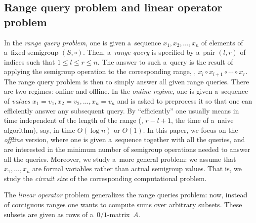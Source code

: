 \documentclass{toc}
\begin{document}
\subsection{Range query problem and linear operator problem}
In the \emph{range query problem},
one is given
a~sequence $x_1, x_2, \dotsc, x_n$ of
elements of a~fixed semigroup $(S, \circ)$.
Then, a~\emph{range query} is
specified by a~pair %
$(l,r)$ of indices  %
such that $1 \le l \le r \le n$.
The answer to such a~query is the result of applying the semigroup
operation to the
corresponding range, \ie, $x_l \circ x_{l+1} \circ \dotsb \circ x_r$.
The range query problem
is then to simply answer all given range
queries.
There are two
regimes: online and offline. In the \emph{online regime}, one is given
a~sequence of \emph{values}
$x_1=v_1, x_2=v_2, \dotsc, x_n=v_n$ and is asked to preprocess
it %
so that one can   %
efficiently answer  %
any subsequent query.
By ``efficiently'' one usually
means in time independent of the length of the range
(\ie, $r-l+1$, the time
of a~naive algorithm), say, in time $O(\log n)$ or $O(1)$.
In this paper, we
focus on the \emph{offline} version, where one is given a~sequence
together with
all the queries, and are interested in the minimum number of
semigroup
operations needed to answer all the queries. Moreover, we study
a~more general
problem: we assume that $x_1, \dotsc, x_n$ are formal variables
rather than
actual semigroup values. That is, we study the \emph{circuit size} of
the corresponding
computational problem.

The \emph{linear operator} problem generalizes the range
queries problem: now, instead of contiguous ranges one wants
to compute sums over arbitrary subsets. These subsets are
given as rows of a~$0/1$-matrix~$A$.  %
\end{document}
